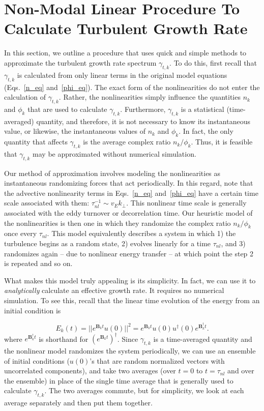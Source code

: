 \documentclass[twocolumn,showkeys,superscriptaddress]{revtex4}
\def\beq{\begin{equation}}
\def\eeq{\end{equation}}
\begin{document}
\section{Non-Modal Linear Procedure To Calculate Turbulent Growth Rate}
\label{sec_nm_procedure}

In this section, we outline a procedure that uses quick and simple methods to approximate the turbulent growth rate spectrum $\gamma_{t,k}$. To do this, first recall that $\gamma_{t,k}$ is calculated
from only linear terms in the original model equations (Eqs.~\ref{n_eq} and~\ref{phi_eq}). The exact form of the nonlinearities do not enter the calculation of $\gamma_{t,k}$. Rather, the nonlinearities
simply influence the quantities $n_k$ and $\phi_k$ that are used to calculate $\gamma_{t,k}$. Furthermore, $\gamma_{t,k}$ is a statistical (time-averaged) quantity, and therefore, it is not
necessary to know its instantaneous value, or likewise, the instantaneous values of $n_k$ and $\phi_k$. In fact, the only quantity that affects $\gamma_{t,k}$ is the average complex ratio $n_k/\phi_k$.
Thus, it is feasible that $\gamma_{t,k}$ may be approximated without numerical simulation.

Our method of approximation involves modeling the nonlinearities as instantaneous randomizing forces that act periodically.
In this regard, note that the advective nonlinearity terms in Eqs.~\ref{n_eq} and~\ref{phi_eq} have a certain time scale associated with them: $\tau_{nl}^{-1} \sim v_E k_\perp$.
This nonlinear time scale is generally associated with the eddy turnover or decorrelation time. Our heuristic model of the nonlinearities is then one
in which they randomize the complex ratio $n_k/\phi_k$ once every $\tau_{nl}$.
This model equivalently describes a system in which 1) the turbulence begins as a random state, 
2) evolves linearly for a time $\tau_{nl}$, and 3) randomizes again -- due to nonlinear energy transfer -- at which point the step 2 is repeated and so on.

What makes this model truly appealing is its simplicity. In fact, we can use it to \emph{analytically} calculate an effective growth rate. It requires no numerical simulation.
To see this, recall that the linear time evolution of the energy from an initial condition is

\beq
\label{E_t_from_u0}
E_k(t) = ||e^{\mathbf{B}_k t} u(0)||^2 = e^{\mathbf{B}_k t} u(0) u^{\dagger}(0) e^{\mathbf{B}_k^{\dagger}t}.
\eeq
where $e^{\mathbf{B}_k^{\dagger}t}$ is shorthand for $\left( e^{\mathbf{B}_k t} \right)^{\dagger}$.
Since $\gamma_{t,k}$ is a time-averaged quantity and the nonlinear model randomizes the system periodically, we can use an ensemble of initial conditions ($u(0)$'s that are random normalized vectors with uncorrelated components),
and take two averages (over $t=0$ to $t = \tau_{nl}$ and over the ensemble) in place of the single time average that is generally used to calculate $\gamma_{t,k}$. The two averages commute, but for simplicity, 
we look at each average separately and then put them together.
\end{document}
